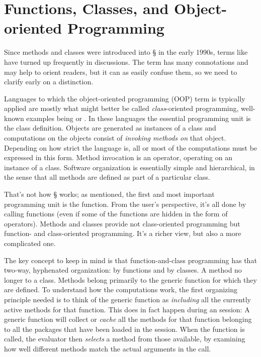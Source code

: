 \documentclass[11pt]{article}
\begin{document}
\section{Functions, Classes, and Object-oriented Programming}
\label{sec:funct-class-object}

Since methods and classes were introduced into \S{} in the early 1990s, terms like  have turned up frequently in discussions.
The term has many connotations and may help to orient readers, but it can as easily confuse them, so we need to clarify early on a distinction.

Languages to which the object-oriented programming (OOP) term is typically applied are mostly what might better be called \emph{class}-oriented programming, well-known examples being \Cpp{} or \Java{}.
In these languages the essential programming unit is the class definition.
Objects are generated as instances of a class and computations on the objects consist of \emph{invoking methods on}  that object.
Depending on how strict the language is, all or most of the computations must be expressed in this form.
Method invocation is an operator, operating on an instance of a class.
Software organization is essentially simple and  hierarchical, in the sense that all methods are defined as part of a particular class.

That's not how \S{} works; as mentioned, the first and most important programming unit is the function.
From the user's perspective, it's all done by calling functions (even if some of the functions are hidden in the form of operators).
Methods and classes provide not class-oriented programming but function- and class-oriented programming.
It's a richer view, but also a  more complicated one.

The key concept to keep in mind is that function-and-class programming has that two-way,  hyphenated organization:  by functions and by classes.
A method no longer  to a class.
Methods belong primarily to the generic function for which they are defined.
To understand how the computations work, the first organizing principle needed is to think of the generic function as \emph{including} all the currently active methods for that function.
This does in fact happen during an \R{} session:  A generic function will collect or \emph{cache} all the methods for that function belonging to all the \R{} packages that have been loaded in the session.
When the function is called, the \R{} evaluator then \emph{selects} a method from those available, by examining how well different methods match the actual arguments in the call.
\end{document}
